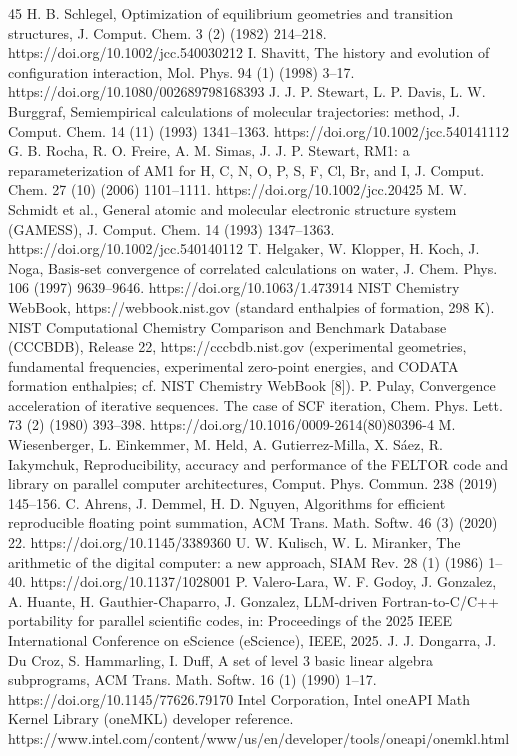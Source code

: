 \documentclass[preprint,12pt]{elsarticle}
\begin{document}
\begin{thebibliography}{45}
 H. B. Schlegel, Optimization of equilibrium geometries and transition structures, J. Comput. Chem. 3 (2) (1982) 214--218. https://doi.org/10.1002/jcc.540030212
 I. Shavitt, The history and evolution of configuration interaction, Mol. Phys. 94 (1) (1998) 3--17. https://doi.org/10.1080/002689798168393
 J. J. P. Stewart, L. P. Davis, L. W. Burggraf, Semiempirical calculations of molecular trajectories: method, J. Comput. Chem. 14 (11) (1993) 1341--1363. https://doi.org/10.1002/jcc.540141112
 G. B. Rocha, R. O. Freire, A. M. Simas, J. J. P. Stewart, RM1: a reparameterization of AM1 for H, C, N, O, P, S, F, Cl, Br, and I, J. Comput. Chem. 27 (10) (2006) 1101--1111. https://doi.org/10.1002/jcc.20425
 M. W. Schmidt et al., General atomic and molecular electronic structure system (GAMESS), J. Comput. Chem. 14 (1993) 1347--1363. https://doi.org/10.1002/jcc.540140112
 T. Helgaker, W. Klopper, H. Koch, J. Noga, Basis-set convergence of correlated calculations on water, J. Chem. Phys. 106 (1997) 9639--9646. https://doi.org/10.1063/1.473914
 NIST Chemistry WebBook, https://webbook.nist.gov (standard enthalpies of formation, 298 K).
 NIST Computational Chemistry Comparison and Benchmark Database (CCCBDB), Release 22, https://cccbdb.nist.gov (experimental geometries, fundamental frequencies, experimental zero-point energies, and CODATA formation enthalpies; cf. NIST Chemistry WebBook [8]).
 P. Pulay, Convergence acceleration of iterative sequences. The case of SCF iteration, Chem. Phys. Lett. 73 (2) (1980) 393--398. https://doi.org/10.1016/0009-2614(80)80396-4
 M. Wiesenberger, L. Einkemmer, M. Held, A. Gutierrez-Milla, X. S\'aez, R. Iakymchuk, Reproducibility, accuracy and performance of the FELTOR code and library on parallel computer architectures, Comput. Phys. Commun. 238 (2019) 145--156.
 C. Ahrens, J. Demmel, H. D. Nguyen, Algorithms for efficient reproducible floating point summation, ACM Trans. Math. Softw. 46 (3) (2020) 22. https://doi.org/10.1145/3389360
 U. W. Kulisch, W. L. Miranker, The arithmetic of the digital computer: a new approach, SIAM Rev. 28 (1) (1986) 1--40. https://doi.org/10.1137/1028001
 P. Valero-Lara, W. F. Godoy, J. Gonzalez, A. Huante, H. Gauthier-Chaparro, J. Gonzalez, LLM-driven Fortran-to-C/C++ portability for parallel scientific codes, in: Proceedings of the 2025 IEEE International Conference on eScience (eScience), IEEE, 2025.
 J. J. Dongarra, J. Du Croz, S. Hammarling, I. Duff, A set of level 3 basic linear algebra subprograms, ACM Trans. Math. Softw. 16 (1) (1990) 1--17. https://doi.org/10.1145/77626.79170
 Intel Corporation, Intel oneAPI Math Kernel Library (oneMKL) developer reference. https://www.intel.com/content/www/us/en/developer/tools/oneapi/onemkl.html
\end{thebibliography}
\end{document}
